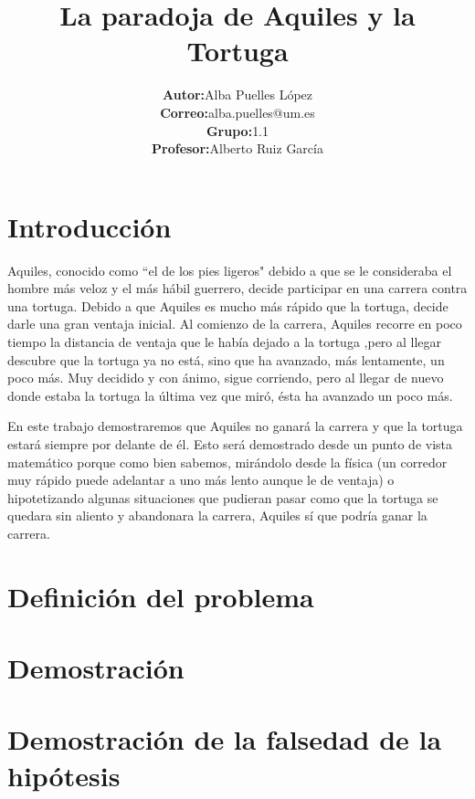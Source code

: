 \documentclass[a4paper,12pt]{article}
\date{}
\title{\textbf{La paradoja de Aquiles y la Tortuga}}
\author{\begin{tabular}{rl}
  \textbf{Autor:} & Alba Puelles López \\
  \textbf{Correo:} & alba.puelles@um.es \\
  \textbf{Grupo:} & 1.1 \\
  \textbf{Profesor:} & Alberto Ruiz García \\
\end{tabular}}
\begin{document}
 
   \maketitle
   
   \newpage

   \tableofcontents

   \newpage
   
   \section{Introducción}
   
   Aquiles, conocido como ``el de los pies ligeros" debido a que se le consideraba 
   el hombre más veloz y el más hábil guerrero, decide participar en una carrera 
   contra una tortuga. Debido a que Aquiles es mucho más rápido que la tortuga, 
   decide darle una gran ventaja inicial. Al comienzo de la carrera, 
   Aquiles recorre en poco tiempo la distancia de ventaja que le había dejado a la tortuga
   ,pero al llegar descubre que la tortuga ya no está, sino que ha avanzado, más lentamente,
   un poco más. Muy decidido y con ánimo, sigue corriendo, pero al llegar de nuevo donde estaba la tortuga
   la última vez que miró, ésta ha avanzado un poco más.
   
   En este trabajo demostraremos que Aquiles no ganará la carrera y que 
   la tortuga estará siempre por delante de él. Esto será demostrado desde un punto de vista matemático
   porque como bien sabemos, mirándolo desde la física (un corredor muy rápido puede adelantar
   a uno más lento aunque le de ventaja) o hipotetizando algunas situaciones que pudieran pasar
   como que la tortuga se quedara sin aliento y abandonara la carrera, Aquiles sí que podría ganar la carrera.
   
   \section{Definición del problema}
   
   
   
   \section{Demostración}
   
   \section{Demostración de la falsedad de la hipótesis}
      
\end{document}
